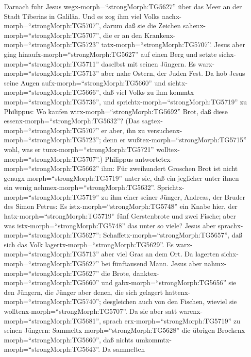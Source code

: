  Darnach fuhr Jesus wegx-morph=``strongMorph:TG5627'' über
das Meer an der Stadt Tiberias in Galiläa.  Und es zog ihm
viel Volks nachx-morph=``strongMorph:TG5707'', darum daß sie die Zeichen
sahenx-morph=``strongMorph:TG5707'', die er an den
Krankenx-morph=``strongMorph:TG5723'' tatx-morph=``strongMorph:TG5707''.
 Jesus aber ging hinaufx-morph=``strongMorph:TG5627'' auf
einen Berg und setzte sichx-morph=``strongMorph:TG5711'' daselbst mit
seinen Jüngern.  Es warx-morph=``strongMorph:TG5713'' aber
nahe Ostern, der Juden Fest.  Da hob Jesus seine Augen
aufx-morph=``strongMorph:TG5660'' und
siehtx-morph=``strongMorph:TG5666'', daß viel Volks zu ihm
kommtx-morph=``strongMorph:TG5736'', und
sprichtx-morph=``strongMorph:TG5719'' zu Philippus: Wo kaufen
wirx-morph=``strongMorph:TG5692'' Brot, daß diese
essenx-morph=``strongMorph:TG5632''?  (Das
sagtex-morph=``strongMorph:TG5707'' er aber, ihn zu
versuchenx-morph=``strongMorph:TG5723''; denn er
wußtex-morph=``strongMorph:TG5715'' wohl, was er
tunx-morph=``strongMorph:TG5721'' wolltex-morph=``strongMorph:TG5707''.)
 Philippus antwortetex-morph=``strongMorph:TG5662'' ihm: Für
zweihundert Groschen Brot ist nicht genugx-morph=``strongMorph:TG5719''
unter sie, daß ein jeglicher unter ihnen ein wenig
nehmex-morph=``strongMorph:TG5632''. 
Sprichtx-morph=``strongMorph:TG5719'' zu ihm einer seiner Jünger,
Andreas, der Bruder des Simon Petrus:  Es
istx-morph=``strongMorph:TG5748'' ein Knabe hier, der
hatx-morph=``strongMorph:TG5719'' fünf Gerstenbrote und zwei Fische;
aber was istx-morph=``strongMorph:TG5748'' das unter so viele?
 Jesus aber sprachx-morph=``strongMorph:TG5627'':
Schaffetx-morph=``strongMorph:TG5657'', daß sich das Volk
lagertx-morph=``strongMorph:TG5629''. Es
warx-morph=``strongMorph:TG5713'' aber viel Gras an dem Ort. Da lagerten
sichx-morph=``strongMorph:TG5627'' bei fünftausend Mann. 
Jesus aber nahmx-morph=``strongMorph:TG5627'' die Brote,
danktex-morph=``strongMorph:TG5660'' und
gabx-morph=``strongMorph:TG5656'' sie den Jüngern, die Jünger aber
denen, die sich gelagert hattenx-morph=``strongMorph:TG5740'';
desgleichen auch von den Fischen, wieviel sie
wolltenx-morph=``strongMorph:TG5707''.  Da sie aber satt
warenx-morph=``strongMorph:TG5681'', sprach
erx-morph=``strongMorph:TG5719'' zu seinen Jüngern:
Sammeltx-morph=``strongMorph:TG5628'' die übrigen
Brockenx-morph=``strongMorph:TG5660'', daß nichts
umkommtx-morph=``strongMorph:TG5643''.  Da sammelten
